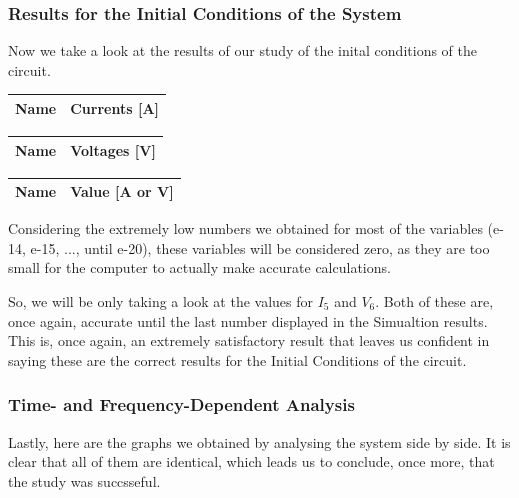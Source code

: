 \subsubsection{Results for the Initial Conditions of the System}

Now we take a look at the results of our study of the inital conditions of the circuit.

  \begin{tabular}{|l|r|}
    \hline    
    {\bf Name} & {\bf Currents [A]} \\ \hline
    
  \end{tabular}
\quad
  \begin{tabular}{|l|r|}
    \hline    
    {\bf Name} & {\bf Voltages [V]} \\ \hline
    
  \end{tabular}
\quad
\begin{tabular}{|l|r|}
    \hline    
    {\bf Name} & {\bf Value [A or V]} \\ \hline
    
  \end{tabular}

Considering the extremely low numbers we obtained for most of the variables (e-14, e-15, ..., until e-20), these variables will be considered zero, as they are too small for the computer to actually make accurate calculations.

So, we will be only taking a look at the values for $I_5$ and $V_6$. Both of these are, once again, accurate until the last number displayed in the Simualtion results. This is, once again, an extremely satisfactory result that leaves us confident in saying these are the correct results for the Initial Conditions of the circuit.

\subsubsection{Time- and Frequency-Dependent Analysis}

Lastly, here are the graphs we obtained by analysing the system side by side. It is clear that all of them are identical, which leads us to conclude, once more, that the study was succsseful.

